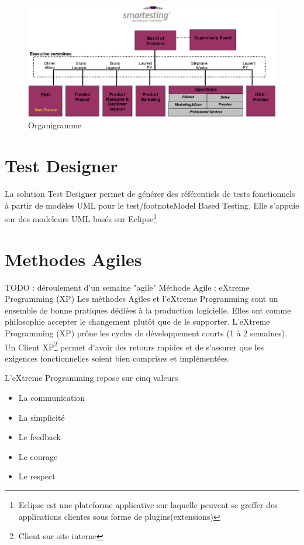 \begin{figure}[!h]
\centering
\includegraphics[scale=0.50]{Illustrations/Organigramme_with_me.png}
\caption{Organigramme}
\label{fig:Organigramme de Smartesting}
\end{figure}

\section{Test Designer}
La solution Test Designer permet de générer des référentiels de tests fonctionnels à partir de modèles UML pour le test/footnote{Model Based Testing}. Elle s'appuie sur des modeleurs UML basés sur Eclipse\footnote{Eclipse est une plateforme applicative sur laquelle peuvent se greffer des applications clientes sous forme de plugins(extensions)} 
\section{Methodes Agiles}
TODO : déroulement d'un semaine "agile"
Méthode Agile : eXtreme Programming  (XP)
Les méthodes Agiles et l'eXtreme Programming sont un ensemble de bonne pratiques dédiées à la production logicielle. Elles ont comme philosophie accepter le changement plutôt que de le supporter. L'eXtreme Programming (XP) pr\^one les cycles de développement courts (1 à 2 semaines). Un Client XP\footnote{Client sur site interne} permet d'avoir des retours rapides et de s'assurer que les exigences fonctionnelles soient bien comprises et implémentées.

L'eXtreme Programming repose sur cinq valeurs
\begin{itemize}
\item{La communication}
\item{La simplicité}
\item{Le feedback}
\item{Le courage}
\item{Le respect}
\end{itemize}
